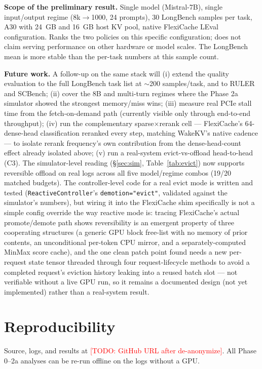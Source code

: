 \documentclass[11pt]{article}
\newcommand{\NEEDPROSE}[1]{\textcolor{red}{[TODO: #1]}}
\begin{document}
\textbf{Scope of the preliminary result.} Single model
(Mistral-7B), single input/output regime (8k$\to$1000, 24 prompts),
30 LongBench samples per task, A30 with 24~GB and 16~GB host KV
pool, native FlexiCache LEval configuration. Ranks the two policies
on this specific configuration; does not claim serving performance
on other hardware or model scales. The LongBench mean is more
stable than the per-task numbers at this sample count.

\textbf{Future work.} A follow-up on the same stack will (i) extend
the quality evaluation to the full LongBench task list at
$\sim$200 samples/task, and to RULER and SCBench; (ii) cover the 8B
and multi-turn regimes where the Phase 2a simulator showed the
strongest memory/miss wins; (iii) measure real PCIe stall time from
the fetch-on-demand path (currently visible only through end-to-end
throughput); (iv) run the complementary sparse$\times$rerank cell ---
FlexiCache's 64-dense-head classification reranked every step,
matching WakeKV's native cadence --- to isolate rerank frequency's own
contribution from the dense-head-count effect already isolated above;
(v) run a real-system evict-vs-offload head-to-head (C3). The
simulator-level reading (\S\ref{sec:sim}, Table~\ref{tab:evict}) now
supports reversible offload on real logs across all five model/regime
combos (19/20 matched budgets). The controller-level code for a real
evict mode is written and tested (\texttt{ReactiveController}'s
\texttt{demotion="evict"}, validated against the simulator's numbers),
but wiring it into the FlexiCache shim specifically is not a simple
config override the way reactive mode is: tracing FlexiCache's actual
promote/demote path shows reversibility is an emergent property of
three cooperating structures (a generic GPU block free-list with no
memory of prior contents, an unconditional per-token CPU mirror, and a
separately-computed MinMax score cache), and the one clean patch point
found needs a new per-request state tensor threaded through four
request-lifecycle methods to avoid a completed request's eviction
history leaking into a reused batch slot --- not verifiable without a
live GPU run, so it remains a documented design (not yet implemented)
rather than a real-system result.

\section*{Reproducibility}
Source, logs, and results at \NEEDPROSE{GitHub URL after de-anonymize}.
All Phase 0--2a analyses can be re-run offline on the logs without a
GPU.
\end{document}

